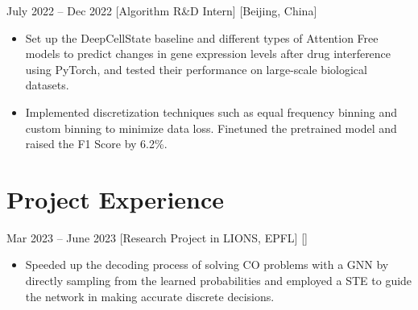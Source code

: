 \documentclass{chicv}
\begin{document}
{July 2022 -- Dec 2022}
[Algorithm R\&D Intern]
[Beijing, China]

\begin{itemize}
	\item Set up the DeepCellState baseline and different types of Attention Free models to predict changes in gene expression levels after drug interference using PyTorch, and tested their performance on large-scale biological datasets.
	\item Implemented discretization techniques such as equal frequency binning and custom binning to minimize data loss. Finetuned the pretrained model and raised the F1 Score by 6.2\%.
\end{itemize}

\section{Project Experience}

{Mar 2023 -- June 2023}
[Research Project in LIONS, EPFL]
[]

\begin{itemize}
	\item Speeded up the decoding process of solving CO problems with a GNN by directly sampling from the learned probabilities and employed a STE to guide the network in making accurate discrete decisions.
\end{itemize}

\end{document}
